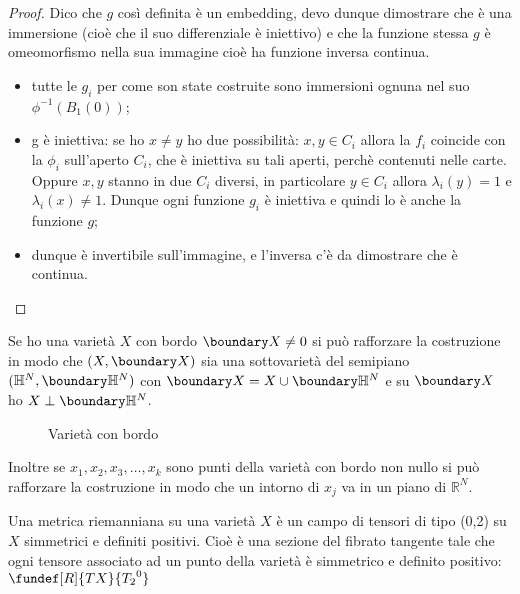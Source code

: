 \begin{proof}
 
 Dico che $g$ così definita è un embedding, devo dunque dimostrare che è una immersione (cioè che il suo differenziale è iniettivo) e che la funzione stessa $g$ è omeomorfismo nella sua immagine cioè ha funzione inversa continua.
 
\begin {itemize}
  \item tutte le $g_{i}$ per come son state costruite sono immersioni ognuna nel suo $\phi^{-1}(B_1(0))$;
  \item g è iniettiva: se ho $x \neq y$  ho due possibilità: $x, y \in C_{i}$ allora la $f_i$ coincide con la $\phi_i$ sull'aperto $C_{i}$, che è iniettiva su tali aperti, perchè contenuti nelle carte. 
  Oppure $x, y$ stanno in due $C_i$ diversi, in particolare $y \in C_{i}$ allora $\lambda_{i}(y) = 1$ e $\lambda_{i}(x) \neq 1$. Dunque ogni funzione $g_i$ è iniettiva e quindi lo è anche la funzione $g$;
  \item dunque è invertibile sull'immagine, e l'inversa c'è da dimostrare che è continua.
  \qedhere
 \end {itemize}
\end{proof}

Se ho una varietà $X$ con bordo $\boundary X \neq 0$ si può rafforzare la costruzione in modo che $(X, \boundary X)$ sia una sottovarietà del semipiano 
$(\mathbb{H}^{N}, \boundary \mathbb{H}^{N})$ con $\boundary X = X \cup \boundary \mathbb{H}^{N}$ e su $\boundary X$ ho $X \perp \boundary \mathbb{H}^{N}$.

\begin{figure}
    \centering %
    
    \caption{Varietà con bordo}
\end{figure}

Inoltre se $x_{1}, x_{2}, x_{3}, \dots, x_{k}$ sono punti della varietà con bordo non nullo si può rafforzare la costruzione in modo che un intorno di $x_{j}$ va in un piano di $\mathbb{R}^{N}$.

\begin{defn} %
 Una metrica riemanniana su una varietà $X$ è un campo di tensori di tipo (0,2) su $X$ simmetrici e definiti positivi. Cioè è una sezione del 
 fibrato tangente tale che ogni tensore associato ad un punto della varietà è simmetrico e definito positivo: $\fundef[R]{TX}{{T_{2}}^{0}}$ 
\end{defn}

